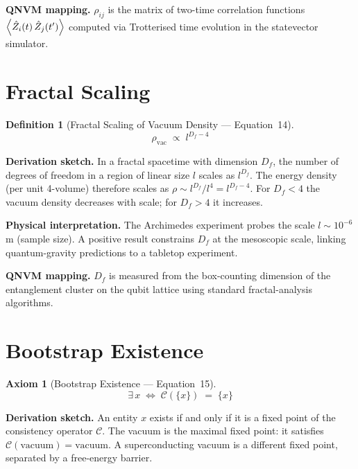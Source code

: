 \documentclass[11pt,a4paper]{article}
\newtheorem{axiom}{Axiom}
\newtheorem{definition}{Definition}[section]
\theoremstyle{remark}
\newcommand{\CalC}{\mathcal{C}}
\begin{document}
\textbf{QNVM mapping.}\quad
$\rho_{ij}$ is the matrix of two-time correlation functions $\expval{\hat{Z}_i(t)\,\hat{Z}_j(t')}$ computed via Trotterised time evolution in the statevector simulator.

\section{Fractal Scaling}
\label{sec:eq14}

\begin{definition}[Fractal Scaling of Vacuum Density --- Equation~14]
\begin{equation}\label{eq:fractal}
    \rho_{\text{vac}} \;\propto\; l^{D_f - 4}
\end{equation}
\end{definition}

\textbf{Derivation sketch.}\quad
In a fractal spacetime with dimension $D_f$, the number of degrees of freedom in a region of linear size $l$ scales as $l^{D_f}$.  The energy density (per unit 4-volume) therefore scales as $\rho \sim l^{D_f}/l^4 = l^{D_f-4}$.  For $D_f<4$ the vacuum density decreases with scale; for $D_f>4$ it increases.

\textbf{Physical interpretation.}\quad
The Archimedes experiment probes the scale $l \sim 10^{-6}$\,m (sample size).  A positive result constrains $D_f$ at the mesoscopic scale, linking quantum-gravity predictions to a tabletop experiment.

\textbf{QNVM mapping.}\quad
$D_f$ is measured from the box-counting dimension of the entanglement cluster on the qubit lattice using standard fractal-analysis algorithms.

\section{Bootstrap Existence}
\label{sec:eq15}

\begin{axiom}[Bootstrap Existence --- Equation~15]
\begin{equation}\label{eq:bootstrap}
    \exists\, x \;\iff\; \CalC(\{x\}) \;=\; \{x\}
\end{equation}
\end{axiom}

\textbf{Derivation sketch.}\quad
An entity $x$ exists if and only if it is a fixed point of the consistency operator $\CalC$.  The vacuum is the maximal fixed point: it satisfies $\CalC(\text{vacuum}) = \text{vacuum}$.  A superconducting vacuum is a different fixed point, separated by a free-energy barrier.
\end{document}
